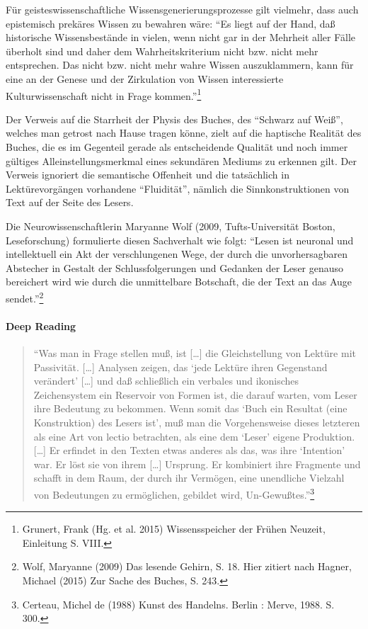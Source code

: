 \documentclass[a4paper,
fontsize=11pt,
oneside,
numbers=noperiodatend,
parskip=half-,
bibliography=totoc,
final
]{scrartcl}
\begin{document}
Für geisteswissenschaftliche Wissensgenerierungsprozesse gilt vielmehr,
dass auch epistemisch prekäres Wissen zu bewahren wäre: \enquote{Es
liegt auf der Hand, daß historische Wissensbestände in vielen, wenn
nicht gar in der Mehrheit aller Fälle überholt sind und daher dem
Wahrheitskriterium nicht bzw. nicht mehr entsprechen. Das nicht bzw.
nicht mehr wahre Wissen auszuklammern, kann für eine an der Genese und
der Zirkulation von Wissen interessierte Kulturwissenschaft nicht in
Frage kommen.}\footnote{Grunert, Frank (Hg. et al. 2015) Wissensspeicher
  der Frühen Neuzeit, Einleitung S. VIII.}

Der Verweis auf die Starrheit der Physis des Buches, des
\enquote{Schwarz auf Weiß}, welches man getrost nach Hause tragen könne,
zielt auf die haptische Realität des Buches, die es im Gegenteil gerade
als entscheidende Qualität und noch immer gültiges
Alleinstellungsmerkmal eines sekundären Mediums zu erkennen gilt. Der
Verweis ignoriert die semantische Offenheit und die tatsächlich in
Lektürevorgängen vorhandene \enquote{Fluidität}, nämlich die
Sinnkonstruktionen von Text auf der Seite des Lesers.

Die Neurowissenschaftlerin Maryanne Wolf (2009, Tufts-Universität
Boston, Leseforschung) formulierte diesen Sachverhalt wie folgt:
\enquote{Lesen ist neuronal und intellektuell ein Akt der verschlungenen
Wege, der durch die unvorhersagbaren Abstecher in Gestalt der
Schlussfolgerungen und Gedanken der Leser genauso bereichert wird wie
durch die unmittelbare Botschaft, die der Text an das Auge
sendet.}\footnote{Wolf, Maryanne (2009) Das lesende Gehirn, S. 18. Hier
  zitiert nach Hagner, Michael (2015) Zur Sache des Buches, S. 243.}

\paragraph{Deep Reading}\label{deep-reading}

\begin{quote}
\enquote{Was man in Frage stellen muß, ist {[}\ldots{}{]} die
Gleichstellung von Lektüre mit Passivität. {[}\ldots{}{]} Analysen
zeigen, das \enquote{jede Lektüre ihren Gegenstand verändert}
{[}\ldots{}{]} und daß schließlich ein verbales und ikonisches
Zeichensystem ein Reservoir von Formen ist, die darauf warten, vom Leser
ihre Bedeutung zu bekommen. Wenn somit das \enquote{Buch ein Resultat
(eine Konstruktion) des Lesers ist}, muß man die Vorgehensweise dieses
letzteren als eine Art von lectio betrachten, als eine dem
\enquote{Leser} eigene Produktion. {[}\ldots{}{]} Er erfindet in den
Texten etwas anderes als das, was ihre \enquote{Intention} war. Er löst
sie von ihrem {[}\ldots{}{]} Ursprung. Er kombiniert ihre Fragmente und
schafft in dem Raum, der durch ihr Vermögen, eine unendliche Vielzahl
von Bedeutungen zu ermöglichen, gebildet wird, Un-Gewußtes.}\footnote{Certeau,
  Michel de (1988) Kunst des Handelns. Berlin : Merve, 1988. S. 300.}
\end{quote}
\end{document}
